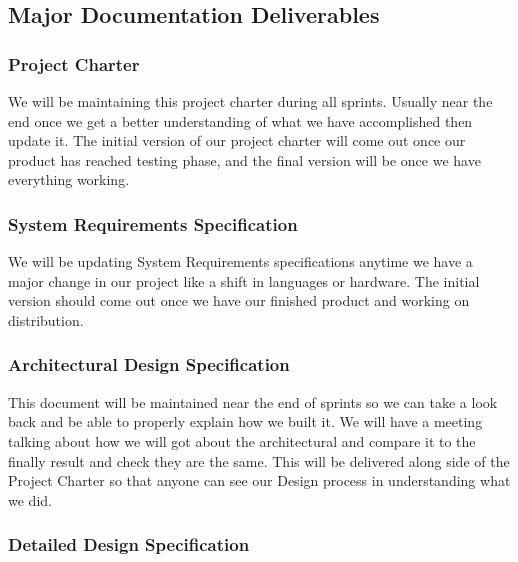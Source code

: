 
\subsection{Major Documentation Deliverables}

\subsubsection{Project Charter}

We will be maintaining this project charter during all sprints. Usually near the end once we get a better understanding of what we have accomplished then update it. The initial version of our project charter will come out once our product has reached testing phase, and the final version will be once we have everything working. 

\subsubsection{System Requirements Specification}

We will be updating System Requirements specifications anytime we have a major change in our project like a shift in languages or hardware. The initial version should come out once we have our finished product and working on distribution. 

\subsubsection{Architectural Design Specification}

This document will be maintained near the end of sprints so we can take a look back and be able to properly explain how we built it. We will have a meeting talking about how we will got about the architectural and compare it to the finally result and check they are the same. This will be delivered along side of the Project Charter so that anyone can see our Design process in understanding what we did.


\subsubsection{Detailed Design Specification}

